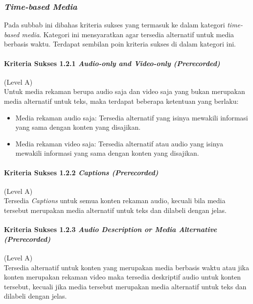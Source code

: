 \subsubsection{\textit{Time-based Media}}
\label{sec:time_based_media}
Pada subbab ini dibahas kriteria sukses yang termasuk ke dalam kategori \textit{time-based media}. Kategori ini mensyaratkan agar tersedia alternatif untuk media berbasis waktu. Terdapat sembilan poin kriteria sukses di dalam kategori ini.

\paragraph{Kriteria Sukses 1.2.1 \textit{Audio-only and Video-only (Prerecorded)}}
\label{sec:kriteria_sukses_1.2.1}
(Level A)\\

Untuk media rekaman berupa audio saja dan video saja yang bukan merupakan media alternatif untuk teks, maka terdapat beberapa ketentuan yang berlaku: 
\begin{itemize}
	\item Media rekaman audio saja: Tersedia alternatif yang isinya mewakili informasi yang sama dengan konten yang disajikan.
	\item Media rekaman video saja: Tersedia alternatif atau audio yang isinya mewakili informasi yang sama dengan konten yang disajikan.
\end{itemize}

\paragraph{Kriteria Sukses 1.2.2 \textit{Captions (Prerecorded)}}
\label{sec:kriteria_sukses_1.2.2}
(Level A)\\

Tersedia \textit{Captions} untuk semua konten rekaman audio, kecuali bila media tersebut merupakan media alternatif untuk teks dan dilabeli dengan jelas.

\paragraph{Kriteria Sukses 1.2.3 \textit{Audio Description or Media Alternative (Prerecorded)}}
\label{sec:kriteria_sukses_1.2.3}
(Level A)\\

Tersedia alternatif untuk konten yang merupakan media berbasis waktu atau jika konten merupakan rekaman video maka tersedia deskriptif audio untuk konten tersebut, kecuali jika media tersebut merupakan media alternatif untuk teks dan dilabeli dengan jelas.

